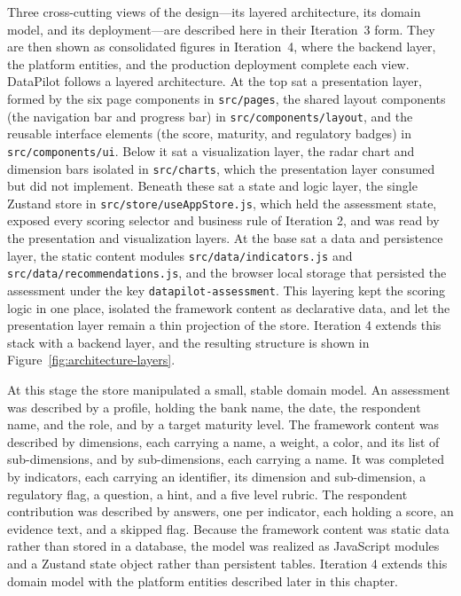 Three cross-cutting views of the design---its layered architecture, its domain model, and its deployment---are described here in their Iteration~3 form. They are then shown as consolidated figures in Iteration~4, where the backend layer, the platform entities, and the production deployment complete each view. DataPilot follows a layered architecture. At the top sat a presentation layer, formed by the six page components in \texttt{src/pages}, the shared layout components (the navigation bar and progress bar) in \texttt{src/components/layout}, and the reusable interface elements (the score, maturity, and regulatory badges) in \texttt{src/components/ui}. Below it sat a visualization layer, the radar chart and dimension bars isolated in \texttt{src/charts}, which the presentation layer consumed but did not implement. Beneath these sat a state and logic layer, the single Zustand store in \texttt{src/store/useAppStore.js}, which held the assessment state, exposed every scoring selector and business rule of Iteration 2, and was read by the presentation and visualization layers. At the base sat a data and persistence layer, the static content modules \texttt{src/data/indicators.js} and \texttt{src/data/recommendations.js}, and the browser local storage that persisted the assessment under the key \texttt{datapilot-assessment}. This layering kept the scoring logic in one place, isolated the framework content as declarative data, and let the presentation layer remain a thin projection of the store. Iteration 4 extends this stack with a backend layer, and the resulting structure is shown in Figure~\ref{fig:architecture-layers}.

At this stage the store manipulated a small, stable domain model. An assessment was described by a profile, holding the bank name, the date, the respondent name, and the role, and by a target maturity level. The framework content was described by dimensions, each carrying a name, a weight, a color, and its list of sub-dimensions, and by sub-dimensions, each carrying a name. It was completed by indicators, each carrying an identifier, its dimension and sub-dimension, a regulatory flag, a question, a hint, and a five level rubric. The respondent contribution was described by answers, one per indicator, each holding a score, an evidence text, and a skipped flag. Because the framework content was static data rather than stored in a database, the model was realized as JavaScript modules and a Zustand state object rather than persistent tables. Iteration 4 extends this domain model with the platform entities described later in this chapter.

